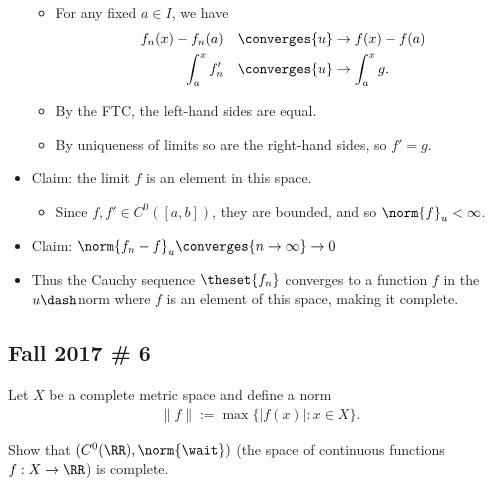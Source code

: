 \begin{solution}
\begin{itemize}
  \begin{itemize}
  \tightlist
  \item
    For any fixed \(a\in I\), we have
    \begin{align*}
    f_n(x) - f_n(a) \quad &\converges{u}\to f(x) - f(a) \\
    \int_a^x f'_n  \quad &\converges{u}\to \int_a^x  g
    .\end{align*}
  \item
    By the FTC, the left-hand sides are equal.
  \item
    By uniqueness of limits so are the right-hand sides, so \(f' = g\).
  \end{itemize}
\item
  Claim: the limit \(f\) is an element in this space.

  \begin{itemize}
  \tightlist
  \item
    Since \(f, f'\in C^0([a, b])\), they are bounded, and so
    \(\norm{f}_u < \infty\).
  \end{itemize}
\item
  Claim: \(\norm{f_n - f}_u \converges{n\to\infty}\to 0\)
\item
  Thus the Cauchy sequence \(\theset{f_n}\) converges to a function
  \(f\) in the \(u\dash\)norm where \(f\) is an element of this space,
  making it complete.
\end{itemize}

\end{solution}

\hypertarget{fall-2017-6}{%
\subsection{Fall 2017 \# 6}\label{fall-2017-6}}

Let \(X\) be a complete metric space and define a norm
\begin{align*}
\|f\|:=\max \{|f(x)|: x \in X\}.
\end{align*}

Show that \((C^0(\RR), \norm{\wait} )\) (the space of continuous
functions \(f: X\to \RR\)) is complete.


